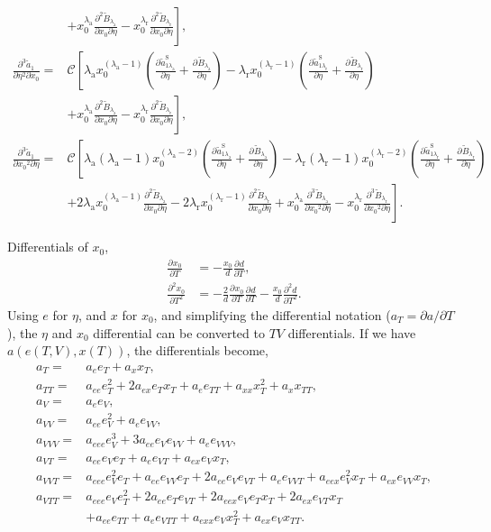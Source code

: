 \documentclass[english]{../thermomemo/thermomemo}
\newcommand*{\pd}[3][]{\frac{\partial^{#1}#2}{\partial{#3}^{#1}}}%
\newcommand*{\pdc}[3]{\frac{\partial^{2}#1}{\partial{#2}\partial{#3}}}%
\newcommand*{\pdcc}[3]{\frac{\partial^{3}#1}{\partial{#2}^{2}\partial{#3}}}%
\newcommand*{\lb}{\left(}
\newcommand*{\rb}{\right)}
\newcommand{\lama}{\ensuremath{{\lambda_{\text{a}}}}\xspace}
\newcommand{\lamr}{\ensuremath{{\lambda_{\text{r}}}}\xspace}
\newcommand{\Bt}{\ensuremath{\tilde{B}}\xspace}
\newcommand{\at}{\ensuremath{\tilde{a}}\xspace}
\newcommand*{\aSlt}[1]{\ensuremath{\tilde{a}_{1{#1}}^{\text{S}}}\xspace}
\begin{document}
\begin{align}
                   & \left. + x_0^{\lama} \pdc{\Bt_\lama}{x_0}{\eta}  - x_0^{\lamr} \pdc{\Bt_\lamr}{x_0}{\eta} \right],\\
  \pdcc{\at_1}{\eta}{x_0} =& \mathcal{C} \left[ \lama x_0^{\lb\lama -1 \rb} \lb \pd{\aSlt{\lama}}{\eta} + \pd{\Bt_\lama}{\eta}  \rb - \lamr x_0^{\lb\lamr -1 \rb} \lb \pd{\aSlt{\lamr}}{\eta} + \pd{\Bt_\lamr}{\eta}  \rb \right. \nonumber \\
                   & \left. + x_0^{\lama} \pdc{\Bt_\lama}{x_0}{\eta}  - x_0^{\lamr} \pdc{\Bt_\lamr}{x_0}{\eta} \right], \\
  \pdcc{\at_1}{x_0}{\eta} =& \mathcal{C} \left[ \lama \lb\lama -1 \rb x_0^{\lb\lama -2 \rb} \lb \pd{\aSlt{\lama}}{\eta} + \pd{\Bt_\lama}{\eta}  \rb - \lamr \lb\lamr -1 \rb x_0^{\lb\lamr -2 \rb} \lb \pd{\aSlt{\lamr}}{\eta} + \pd{\Bt_\lamr}{\eta}  \rb \right. \nonumber\\
  & \left. + 2\lama x_0^{\lb\lama -1 \rb} \pdc{\Bt_\lama}{x_0}{\eta} - 2\lamr x_0^{\lb\lamr -1 \rb} \pdc{\Bt_\lamr}{x_0}{\eta} + x_0^{\lama} \pdcc{\Bt_\lama}{x_0}{\eta}  - x_0^{\lamr} \pdcc{\Bt_\lamr}{x_0}{\eta} \right].
\end{align}

Differentials of $x_0$,
\begin{align}
  \label{eq:x0_diff}
  \pd{x_0}{T} &= -\frac{x_0}{d}\pd{d}{T},\\
  \pd[2]{x_0}{T} &= -\frac{2}{d}\pd{x_0}{T}\pd{d}{T} -\frac{x_0}{d}\pd[2]{d}{T}.
\end{align}
Using $e$ for $\eta$, and $x$ for $x_0$, and simplifying the
differential notation ($a_T = \partial a/\partial T$), the $\eta$ and
$x_0$ differential can be converted to $TV$ differentials. If we have
$a(e(T,V),x(T))$, the differentials become,
\begin{align}
  a_{T} =& a_{e} e_{T} + a_{x} x_{T},\\
  a_{TT} =& a_{ee} e_{T}^2 + 2 a_{ex} e_{T} x_{T} + a_{e} e_{TT} + a_{xx} x_{T}^2 + a_{x} x_{TT},\\
  a_{V} =& a_{e} e_{V},\\
  a_{VV} =& a_{ee} e_{V}^2 + a_{e} e_{VV},\\
  a_{VVV} =& a_{eee} e_{V}^3 + 3 a_{ee} e_{V} e_{VV} + a_{e} e_{VVV},\\
  a_{VT} =& a_{ee} e_{V}e_{T} + a_{e} e_{VT} + a_{ex} e_{V}x_{T},\\
  a_{VVT} =& a_{eee} e_{V}^2e_{T} + a_{ee} e_{VV} e_{T} + 2 a_{ee} e_{V} e_{VT} + a_{e} e_{VVT}  + a_{eex} e_{V}^2x_{T} + a_{ex} e_{VV}x_{T},\\
  a_{VTT} =& a_{eee} e_{V}e_{T}^2 + 2 a_{ee} e_{T}e_{VT} + 2 a_{eex} e_{V} e_{T} x_{T} + 2 a_{ex} e_{VT} x_{T} \nonumber \\ & + a_{ee} e_{TT} + a_{e} e_{VTT} + a_{exx} e_{V}x_{T}^2 + a_{ex} e_{V} x_{TT}.
\end{align}
\end{document}
